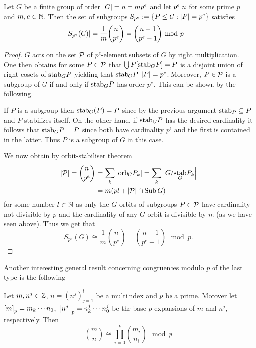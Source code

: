 \documentclass[8pt,a4paper]{article}
\begin{document}
\begin{theorem}
    Let $G$ be a finite group of order $\card{G}=n=mp^e$ and let $p^e\divides n$ for some prime $p$ and $m,e\in \nats$. Then the set of subgroups $S_{p^e}:=\set{P\leq G:\card{P}=p^e}$ satisfies
    \begin{eqnarray}
        \card{S_{p^e}(G)} &=\frac{1}{m}\binom{n}{p^e}=\binom{n-1}{p^e-1} \mod p
    \end{eqnarray}
\end{theorem}

\begin{proof}
    $G$ acts on the set $\cP$ of $p^e$-element subsets of $G$ by right multiplication. One then obtains for some $P\in\cP$ that $\Setjoin{P[\stab[G]{P}]}=P$ is a disjoint union of right cosets of $\stab[G]{P}$ yielding that $\stab[G]{P}\divides\card{P}=p^e$. Moreover, $P\in \cP$ is a subgroup of $G$ if and only if $\stab[G]{P}$ has order $p^e$.
    This can be shown by the following.

    If $P$ is a subgroup then $\stab[G](P)=P$ since by the previous argument $\stab[P]\subseteq P$ and $P$ stabilizes itself.
    On the other hand, if $\stab[G]{P}$ has the desired cardinality it follows that $\stab[G]{P}=P$ since both have cardinality $p^e$ and the first is contained in the latter. Thus $P$ is a subgroup of $G$ in this case.
    
    We now obtain by orbit-stabiliser theorem
    \begin{eqnarray}
        \card{\cP}=\binom{n}{p^e} &= \sum_{k}{\card{\orb[G]{P_k}}} = \sum_{k}{\card{G/\stab[G]{P_k}}}\\
        &= m(pl+\card{\cP}\setmeet\Sub{G})
    \end{eqnarray}
    for some number $l\in\nats$ as only the $G$-orbits of subgroups $P\in\cP$ have cardinality not divisible by $p$ and the cardinality of any $G$-orbit is divisible by $m$ (as we have seen above).
    Thus we get that
    \begin{equation}
        S_{p^e}(G)\cong\frac{1}{m}\binom{n}{p^e}=\binom{n-1}{p^e-1} \mod p.
    \end{equation}
\end{proof}

Another interesting general result concerning congruences modulo $p$ of the last type is the following

\begin{theorem}[Lucas]
    Let $m,n^j\in\ints$, $n={(n^j)}_{j=1}^l$ be a multiindex and $p$ be a prime. Morover let $\base{p}{m}=m_k\cdots n_0$, $\base{p}{n^j}=n^j_k\cdots n^j_0$ be the base $p$ expansions of $m$ and $n^j$, respectively. Then
    \begin{equation}
        \binom{m}{n}\cong \prod_{i=0}^k{\binom{m_i}{n_i}} \mod p
    \end{equation}
\end{theorem}
\end{document}
